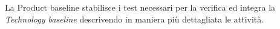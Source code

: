 La Product baseline stabilisce i test necessari per la verifica ed integra la \emph{Technology baseline} descrivendo in maniera pi\`{u} dettagliata le attivit\`{a}.